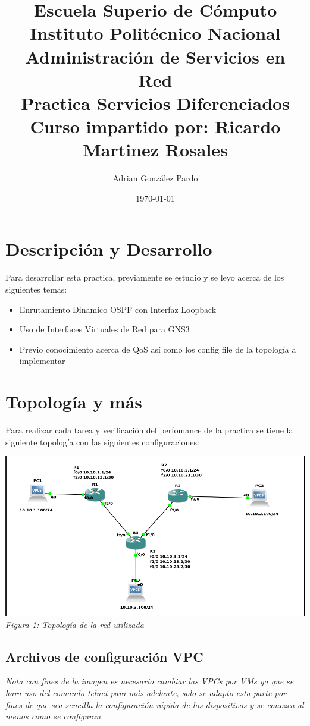 \documentclass[10pt]{article}
\title{Escuela Superio de Cómputo\\Instituto Politécnico Nacional\\Administración de Servicios en Red\\Practica Servicios Diferenciados\\Curso impartido por: Ricardo Martinez Rosales}
\author{Adrian González Pardo}
\date{\today}
\begin{document}
\maketitle
\section{Descripción y Desarrollo}
Para desarrollar esta practica, previamente se estudio y se leyo acerca de los siguientes temas:
\begin{itemize}
  \item Enrutamiento Dinamico OSPF con Interfaz Loopback
  \item Uso de Interfaces Virtuales de Red para GNS3
  \item Previo conocimiento acerca de QoS así como los config file de la topología a implementar
\end{itemize}
\section{Topología y más}
Para realizar cada tarea y verificación del perfomance de la practica se tiene la siguiente topología con las siguientes configuraciones:
\begin{center}
  \includegraphics[scale=0.5]{imgs/1.png}
  \\\textit{Figura 1: Topología de la red utilizada}
\end{center}
\subsection{Archivos de configuración VPC}
\textit{Nota con fines de la imagen es necesario cambiar las VPCs por VMs ya que se hara uso del comando telnet para más adelante, solo se adapto esta parte por fines de que sea sencilla la configuración rápida de los dispositivos y se conozca al menos como se configuran.}
\end{document}
